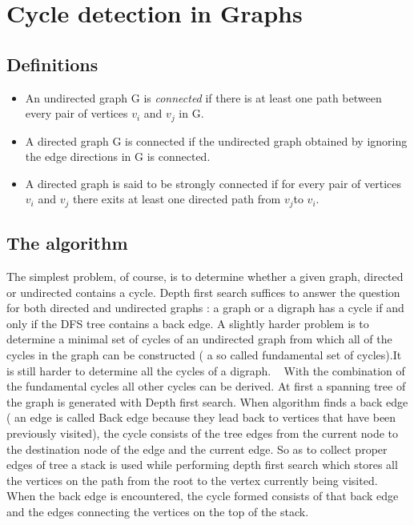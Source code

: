     \chapter{Cycle detection in Graphs} \label{cyldetect}

    \section{Definitions}

    \begin{itemize}

    \item
    An undirected graph G is {\em connected} if there is at least one
    path between every pair of vertices $v_{i}$ and $v_{j}$ in G.
    \item
    A directed graph G is connected if the undirected graph obtained by
    ignoring the edge directions in G is connected.
    \item
    A directed graph is said to be strongly connected if for every pair of
    vertices $v_{i}$ and $v_{j}$ there exits at least one directed path from
    $ v_{j} $to $v_{i}$.

    \end{itemize}

	\section{The algorithm}

    The simplest problem, of course, is to determine whether a given graph,
    directed or undirected contains a cycle. Depth first search suffices
    to answer the question for both directed and undirected graphs : a graph
    or a digraph has a cycle if and only if the DFS tree contains a back edge.
    A slightly harder problem is to determine a minimal set of cycles of an
    undirected graph from which all of the cycles in the graph can be
    constructed ( a so called fundamental set of cycles).It is still harder
    to determine all the cycles of a digraph. ~\cite{Rein}
    With the combination of the fundamental cycles all other cycles can be
    derived.
        At first a spanning tree of the graph is generated with Depth first
    search. When algorithm finds a back edge ( an edge is called Back edge
    because they lead back to vertices that have been previously visited),
    the cycle consists of the tree edges from the current node to the
    destination node of the edge and the current edge. So as to collect proper
    edges of tree a stack is used while performing depth first search which
    stores all the vertices on the path from the root to the vertex currently
    being visited. When the back edge is encountered, the cycle formed
    consists of that back edge and the edges connecting the vertices on the
    top of the stack.


